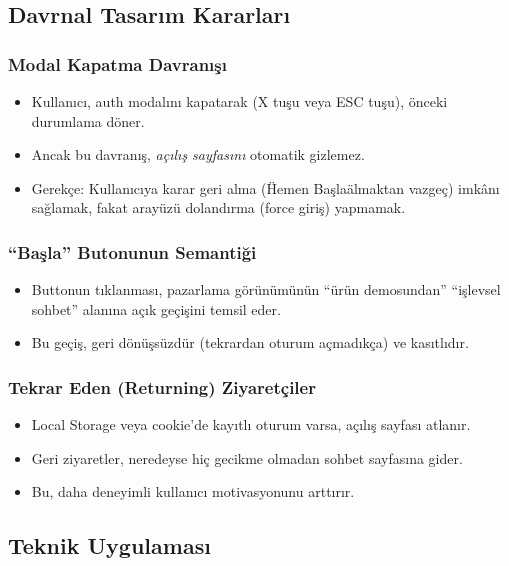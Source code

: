 \documentclass[12pt,a4paper]{article}
\begin{document}
\subsection{Davrnal Tasarım Kararları}

\subsubsection{Modal Kapatma Davranışı}
\begin{itemize}[leftmargin=*]
  \item Kullanıcı, auth modalını kapatarak (X tuşu veya ESC tuşu), önceki durumlama döner.
  \item Ancak bu davranış, \textit{açılış sayfasını} otomatik gizlemez.
  \item Gerekçe: Kullanıcıya karar geri alma (\"Hemen Başla\" almaktan vazgeç) imkânı sağlamak, fakat arayüzü dolandırma (force giriş) yapmamak.
\end{itemize}

\subsubsection{``Başla'' Butonunun Semantiği}
\begin{itemize}[leftmargin=*]
  \item Buttonun tıklanması, pazarlama görünümünün ``ürün demosundan'' ``işlevsel sohbet'' alanına açık geçişini temsil eder.
  \item Bu geçiş, geri dönüşsüzdür (tekrardan oturum açmadıkça) ve kasıtlıdır.
\end{itemize}

\subsubsection{Tekrar Eden (Returning) Ziyaretçiler}
\begin{itemize}[leftmargin=*]
  \item Local Storage veya cookie'de kayıtlı oturum varsa, açılış sayfası atlanır.
  \item Geri ziyaretler, neredeyse hiç gecikme olmadan sohbet sayfasına gider.
  \item Bu, daha deneyimli kullanıcı motivasyonunu arttırır.
\end{itemize}

\subsection{Teknik Uygulaması}
\end{document}
